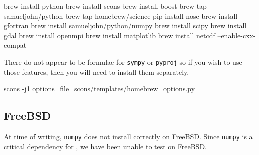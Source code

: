 \begin{shellCode}
brew install python
brew install scons
brew install boost
brew tap samueljohn/python
brew tap homebrew/science
pip install nose
brew install gfortran
brew install samueljohn/python/numpy
brew install scipy
brew install gdal
brew install openmpi
brew install matplotlib
brew install netcdf --enable-cxx-compat
\end{shellCode}

There do not appear to be formulae for \texttt{sympy} or \texttt{pyproj} so if you wish to use those features, then
you will need to install them separately.


\begin{shellCode}
scons -j1 options_file=scons/templates/homebrew_options.py
\end{shellCode}


\subsection{FreeBSD}\label{sec:freebsdsrc}

At time of writing, \texttt{numpy} does not install correctly on FreeBSD.
Since \texttt{numpy} is a critical dependency for \escript, we have been unable to test on FreeBSD.

